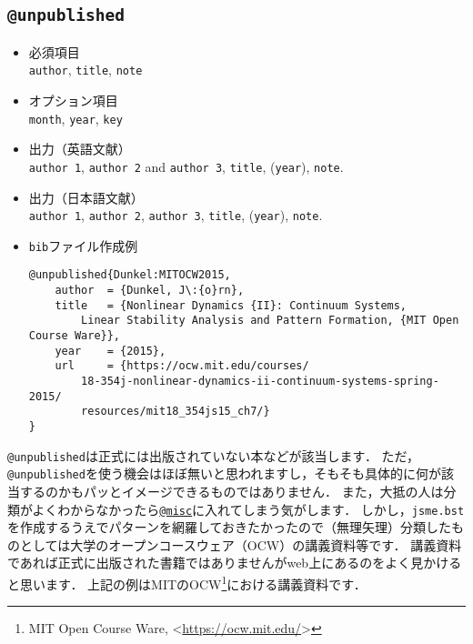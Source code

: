 \documentclass[a4paper,fleqn,uplatex,dvipdfmx]{jsarticle}
\newcommand{\jsmefile}{\texttt{jsme.bst}}
\begin{document}
\subsection{\texttt{@unpublished}}
\label{ssec:unpublished}
\begin{screen}
    \begin{itemize}
        \item 必須項目 \\
        \verb|author|, \verb|title|, \verb|note|
        \item オプション項目 \\
        \verb|month|, \verb|year|, \verb|key|
        \item 出力（英語文献） \\
            \colorbox[gray]{0.8}{\texttt{author 1}}, \colorbox[gray]{0.8}{\texttt{author 2}} and \colorbox[gray]{0.8}{\texttt{author 3}}, \colorbox[gray]{0.8}{\texttt{title}}, (\colorbox[gray]{0.8}{\texttt{year}}), \colorbox[gray]{0.8}{\texttt{note}}.
        \item 出力（日本語文献） \\
            \colorbox[gray]{0.8}{\texttt{author 1}}, \colorbox[gray]{0.8}{\texttt{author 2}}, \colorbox[gray]{0.8}{\texttt{author 3}}, \colorbox[gray]{0.8}{\texttt{title}}, (\colorbox[gray]{0.8}{\texttt{year}}), \colorbox[gray]{0.8}{\texttt{note}}.
        \item \verb|bib|ファイル作成例 \vspace{-3mm}
\begin{verbatim}
@unpublished{Dunkel:MITOCW2015,
    author  = {Dunkel, J\:{o}rn},
    title   = {Nonlinear Dynamics {II}: Continuum Systems, 
        Linear Stability Analysis and Pattern Formation, {MIT Open Course Ware}},
    year    = {2015},
    url     = {https://ocw.mit.edu/courses/
        18-354j-nonlinear-dynamics-ii-continuum-systems-spring-2015/
        resources/mit18_354js15_ch7/}
}
\end{verbatim}
    \end{itemize}
\end{screen}

\verb|@unpublished|は正式には出版されていない本などが該当します．
ただ，\verb|@unpublished|を使う機会はほぼ無いと思われますし，そもそも具体的に何が該当するのかもパッとイメージできるものではありません．
また，大抵の人は分類がよくわからなかったら\hyperref[ssec:misc]{\texttt{@misc}}に入れてしまう気がします．
しかし，\jsmefile を作成するうえでパターンを網羅しておきたかったので（無理矢理）分類したものとしては大学のオープンコースウェア（OCW）の講義資料等です．
講義資料であれば正式に出版された書籍ではありませんがweb上にあるのをよく見かけると思います．
上記の例はMITのOCW\footnote{MIT Open Course Ware, \textless\url{https://ocw.mit.edu/}\textgreater}における講義資料です．
\end{document}

